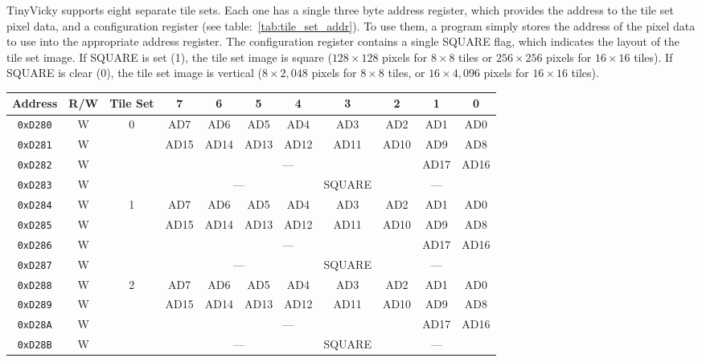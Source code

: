 TinyVicky supports eight separate tile sets. Each one has a single three byte address register, which provides the address to the tile set pixel data, and a configuration register (see table:~\ref{tab:tile_set_addr}). To use them, a program simply stores the address of the pixel data to use into the appropriate address register. The configuration register contains a single SQUARE flag, which indicates the layout of the tile set image. If SQUARE is set (1), the tile set image is square ($128 \times 128$ pixels for $8 \times 8$ tiles or $256 \times 256$ pixels for $16 \times 16$ tiles). If SQUARE is clear (0), the tile set image is vertical ($8 \times 2,048$ pixels for $8 \times 8$ tiles, or $16 \times 4,096$ pixels for $16 \times 16$ tiles).

\begin{table}[ht]
    \begin{center}
        \begin{tabular}{|c|c|c|c|c|c|c|c|c|c|c|} \hline
            Address & R/W & Tile Set & 7 & 6 & 5 & 4 & 3 & 2 & 1 & 0 \\ \hline\hline
            \verb+0xD280+ & W & \multirow{4}{*}{0} & AD7 & AD6 & AD5 & AD4 & AD3 & AD2 & AD1 & AD0 \\ \cline{1-2}\cline{4-11}
            \verb+0xD281+ & W &                    & AD15 & AD14 & AD13 & AD12 & AD11 & AD10 & AD9 & AD8 \\ \cline{1-2}\cline{4-11}
            \verb+0xD282+ & W &                    & \multicolumn{6}{|c|}{---} & AD17 & AD16 \\ \cline{1-2}\cline{4-11}
            \verb+0xD283+ & W &                    & \multicolumn{4}{|c|}{---} & SQUARE & \multicolumn{3}{|c|}{---} \\ \hline\hline

            \verb+0xD284+ & W & \multirow{4}{*}{1} & AD7 & AD6 & AD5 & AD4 & AD3 & AD2 & AD1 & AD0 \\ \cline{1-2}\cline{4-11}
            \verb+0xD285+ & W &                    & AD15 & AD14 & AD13 & AD12 & AD11 & AD10 & AD9 & AD8 \\ \cline{1-2}\cline{4-11}
            \verb+0xD286+ & W &                    & \multicolumn{6}{|c|}{---} & AD17 & AD16 \\ \cline{1-2}\cline{4-11}
            \verb+0xD287+ & W &                    & \multicolumn{4}{|c|}{---} & SQUARE & \multicolumn{3}{|c|}{---} \\ \hline\hline

            \verb+0xD288+ & W & \multirow{4}{*}{2} & AD7 & AD6 & AD5 & AD4 & AD3 & AD2 & AD1 & AD0 \\ \cline{1-2}\cline{4-11}
            \verb+0xD289+ & W &                    & AD15 & AD14 & AD13 & AD12 & AD11 & AD10 & AD9 & AD8 \\ \cline{1-2}\cline{4-11}
            \verb+0xD28A+ & W &                    & \multicolumn{6}{|c|}{---} & AD17 & AD16 \\ \cline{1-2}\cline{4-11}
            \verb+0xD28B+ & W &                    & \multicolumn{4}{|c|}{---} & SQUARE & \multicolumn{3}{|c|}{---} \\ \hline\hline


\end{tabular}
\end{center}
\end{table}
